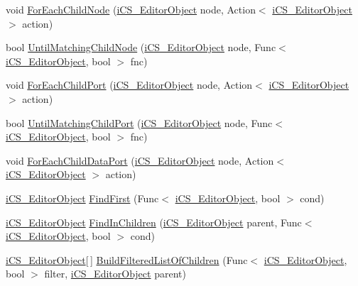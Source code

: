 \begin{DoxyCompactItemize}
\item 
void \hyperlink{classi_c_s___i_storage_a121fe5e11b558912064276c295e93a81}{For\+Each\+Child\+Node} (\hyperlink{classi_c_s___editor_object}{i\+C\+S\+\_\+\+Editor\+Object} node, Action$<$ \hyperlink{classi_c_s___editor_object}{i\+C\+S\+\_\+\+Editor\+Object} $>$ action)
\item 
bool \hyperlink{classi_c_s___i_storage_ab2133066e8509489ec60192a34aeef05}{Until\+Matching\+Child\+Node} (\hyperlink{classi_c_s___editor_object}{i\+C\+S\+\_\+\+Editor\+Object} node, Func$<$ \hyperlink{classi_c_s___editor_object}{i\+C\+S\+\_\+\+Editor\+Object}, bool $>$ fnc)
\item 
void \hyperlink{classi_c_s___i_storage_aa6546cf3e4d11c2e07a91c7a23bd16a2}{For\+Each\+Child\+Port} (\hyperlink{classi_c_s___editor_object}{i\+C\+S\+\_\+\+Editor\+Object} node, Action$<$ \hyperlink{classi_c_s___editor_object}{i\+C\+S\+\_\+\+Editor\+Object} $>$ action)
\item 
bool \hyperlink{classi_c_s___i_storage_af016888b47e9c458d7d0690446fb9175}{Until\+Matching\+Child\+Port} (\hyperlink{classi_c_s___editor_object}{i\+C\+S\+\_\+\+Editor\+Object} node, Func$<$ \hyperlink{classi_c_s___editor_object}{i\+C\+S\+\_\+\+Editor\+Object}, bool $>$ fnc)
\item 
void \hyperlink{classi_c_s___i_storage_ae519c60a72c54b386d58692b844dbad7}{For\+Each\+Child\+Data\+Port} (\hyperlink{classi_c_s___editor_object}{i\+C\+S\+\_\+\+Editor\+Object} node, Action$<$ \hyperlink{classi_c_s___editor_object}{i\+C\+S\+\_\+\+Editor\+Object} $>$ action)
\item 
\hyperlink{classi_c_s___editor_object}{i\+C\+S\+\_\+\+Editor\+Object} \hyperlink{classi_c_s___i_storage_a217f8b5c534a05d325edcc84775a140f}{Find\+First} (Func$<$ \hyperlink{classi_c_s___editor_object}{i\+C\+S\+\_\+\+Editor\+Object}, bool $>$ cond)
\item 
\hyperlink{classi_c_s___editor_object}{i\+C\+S\+\_\+\+Editor\+Object} \hyperlink{classi_c_s___i_storage_aa1fd3c64d463672f1de26c173fa625bc}{Find\+In\+Children} (\hyperlink{classi_c_s___editor_object}{i\+C\+S\+\_\+\+Editor\+Object} parent, Func$<$ \hyperlink{classi_c_s___editor_object}{i\+C\+S\+\_\+\+Editor\+Object}, bool $>$ cond)
\item 
\hyperlink{classi_c_s___editor_object}{i\+C\+S\+\_\+\+Editor\+Object}\mbox{[}$\,$\mbox{]} \hyperlink{classi_c_s___i_storage_a647f3e04f7558ff5b3c1b59e240ef0a5}{Build\+Filtered\+List\+Of\+Children} (Func$<$ \hyperlink{classi_c_s___editor_object}{i\+C\+S\+\_\+\+Editor\+Object}, bool $>$ filter, \hyperlink{classi_c_s___editor_object}{i\+C\+S\+\_\+\+Editor\+Object} parent)

\end{DoxyCompactItemize}
